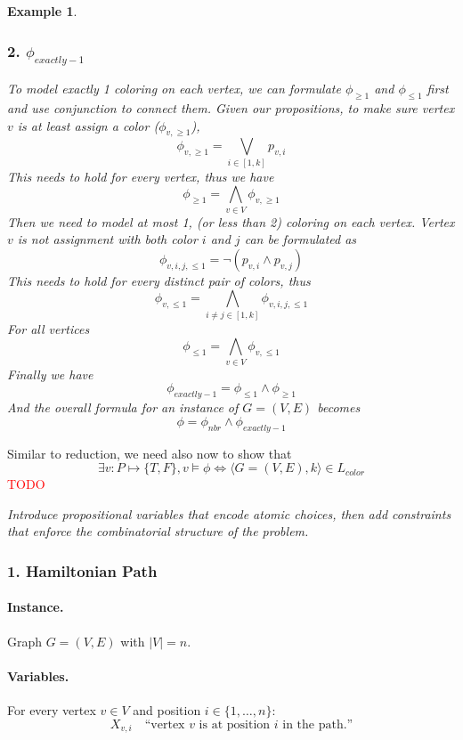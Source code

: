 \documentclass{article}
\newtheorem{example}[theorem]{Example}
\begin{document}
\begin{example}
    \subsubsection*{2. $\phi_{exactly-1}$}
    To model exactly 1 coloring on each vertex, we can formulate $\phi_{\geq 1}$ and $\phi_{\leq 1}$ first and use conjunction to connect them.
    Given our propositions, to make sure vertex $v$ is at least assign a color ($\phi_{v, \geq 1}$), 
    \[\phi_{v, \geq 1} = \bigvee_{i \in [1, k]} p_{v, i}\]
    This needs to hold for every vertex, thus we have 
    \[\phi_{\geq 1} = \bigwedge_{v \in V} \phi_{v, \geq 1}\]
    Then we need to model at most 1, (or less than 2) coloring on each vertex. Vertex $v$ is not assignment with both color $i$ and $j$ can be formulated as 
    \[\phi_{v, i, j,\leq 1} = \neg(p_{v, i} \land p_{v, j})\]
    This needs to hold for every distinct pair of colors, thus
    \[\phi_{v, \leq 1} = \bigwedge_{i \neq j \in [1, k]} \phi_{v, i, j, \leq 1}\]
    For all vertices
    \[\phi_{\leq 1} = \bigwedge_{v\in V} \phi_{v, \leq 1}\]
    Finally we have 
    \[\phi_{exactly-1} = \phi_{\leq 1} \land \phi_{\geq 1}\]
    And the overall formula for an instance of $G = (V, E)$ becomes 
    \[\phi = \phi_{nbr} \land \phi_{exactly-1}\]
\end{example}
Similar to reduction, we need also now to show that 
\[\exists v: P \mapsto \{T, F\}, v \models \phi \iff \langle G = (V, E), k\rangle \in L_{color}\]
\textcolor{red}{TODO}

\begin{center}
\emph{Introduce propositional variables that encode atomic choices, then add
constraints that enforce the combinatorial structure of the problem.}
\end{center}

\subsubsection*{1. Hamiltonian Path}

\paragraph{Instance.}
Graph $G=(V,E)$ with $|V|=n$.

\paragraph{Variables.}
For every vertex $v \in V$ and position $i \in \{1,\dots,n\}$:
\[
X_{v,i} \quad \text{``vertex $v$ is at position $i$ in the path.''}
\]
\end{document}
